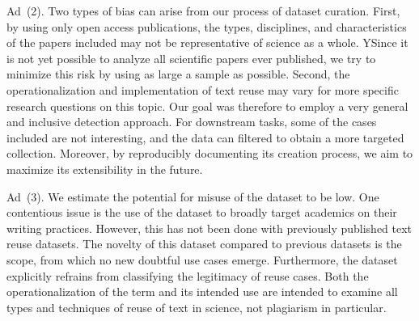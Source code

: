 Ad~(2). 
Two types of bias can arise from our process of dataset curation. First, by using only open access publications, the types, disciplines, and characteristics of the papers included may not be representative of science as a whole. YSince it is not yet possible to analyze all scientific papers ever published, we try to minimize this risk by using as large a sample as possible. Second, the operationalization and implementation of text reuse may vary for more specific research questions on this topic. Our goal was therefore to employ a very general and inclusive detection approach. For downstream tasks, some of the cases included are not interesting, and the data can filtered to obtain a more targeted collection. Moreover, by reproducibly documenting its creation process, we aim to maximize its extensibility in the future.

Ad~(3).
We estimate the potential for misuse of the dataset to be low. One contentious issue is the use of the dataset to broadly target academics on their writing practices. However, this has not been done with previously published text reuse datasets. The novelty of this dataset compared to previous datasets is the scope, from which no new doubtful use cases emerge. Furthermore, the dataset explicitly refrains from classifying the legitimacy of reuse cases. Both the operationalization of the term and its intended use are intended to examine all types and techniques of reuse of text in science, not plagiarism in particular.






